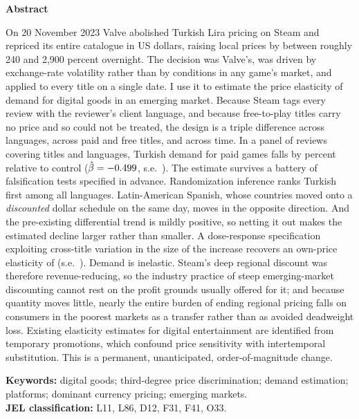 \documentclass[11pt]{article}
\begin{document}
\vspace{14pt}
\begin{center}
\begin{minipage}{0.90\textwidth}
\small
\begin{center}\textbf{Abstract}\end{center}
\vspace{-2pt}
On 20 November 2023 Valve abolished Turkish Lira pricing on Steam and repriced its entire
catalogue in US dollars, raising local prices by between roughly 240 and 2{,}900 percent
overnight. The decision was Valve's, was driven by exchange-rate volatility rather than by
conditions in any game's market, and applied to every title on a single date. I use it to
estimate the price elasticity of demand for digital goods in an emerging market. Because Steam
tags every review with the reviewer's client language, and because free-to-play titles carry no
price and so could not be treated, the design is a triple difference across languages, across
paid and free titles, and across time. In a panel of \Nreviews{} reviews covering \Ngames{}
titles and \Nlang{} languages, Turkish demand for paid games falls by \pctDiD{} percent relative
to control ($\hat\beta = -0.499$, s.e.\ \seDiD). The estimate survives a battery of falsification
tests specified in advance. Randomization inference ranks Turkish first among all \riN{}
languages. Latin-American Spanish, whose countries moved onto a \emph{discounted} dollar schedule
on the same day, moves in the opposite direction. And the pre-existing differential trend is
mildly positive, so netting it out makes the estimated decline larger rather than smaller. A
dose-response specification exploiting cross-title variation in the size of the increase recovers
an own-price elasticity of \bDose{} (s.e.\ \seDose). Demand is inelastic.
Steam's deep regional discount was therefore revenue-reducing, so the industry practice of steep
emerging-market discounting cannot rest on the profit grounds usually offered for it; and because
quantity moves little, nearly the entire burden of ending regional pricing falls on consumers in
the poorest markets as a transfer rather than as avoided deadweight loss. Existing elasticity
estimates for digital entertainment are identified from temporary promotions, which confound price
sensitivity with intertemporal substitution. This is a permanent, unanticipated, order-of-magnitude
change.

\vspace{9pt}
\noindent\textbf{Keywords:} digital goods; third-degree price discrimination; demand estimation;
platforms; dominant currency pricing; emerging markets.\\
\noindent\textbf{JEL classification:} L11, L86, D12, F31, F41, O33.
\end{minipage}
\end{center}
\end{document}
